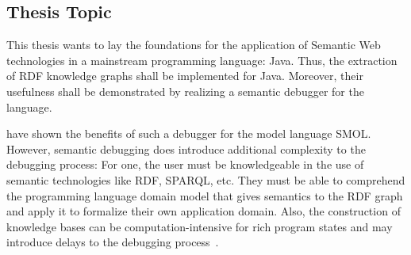 \documentclass[
	english,
	accentcolor=9c,%
  marginpar=0cm %
	]{tudapub}
\begin{document}
%
%
%
%
%
%
%
%
%
%

\subsection{Thesis Topic}

This thesis wants to lay the foundations for the application of Semantic Web
technologies in a mainstream programming language: Java.
%
Thus, the extraction of RDF knowledge graphs shall be implemented
for Java. Moreover, their usefulness shall be demonstrated by realizing a
semantic debugger for the language.

 have shown the benefits of such a debugger
for the model language SMOL. 
However, semantic debugging does introduce additional complexity to the
debugging process:
For one, the user must be knowledgeable in the use of semantic technologies like RDF,
SPARQL, etc.
They must be able to comprehend the programming language domain model that gives
semantics to the RDF graph and apply it to formalize their own application domain.
Also, the construction of knowledge bases can be computation-intensive for rich
program states and may introduce delays to the debugging
process~\cite{kamburjan2021programming}.
\end{document}
